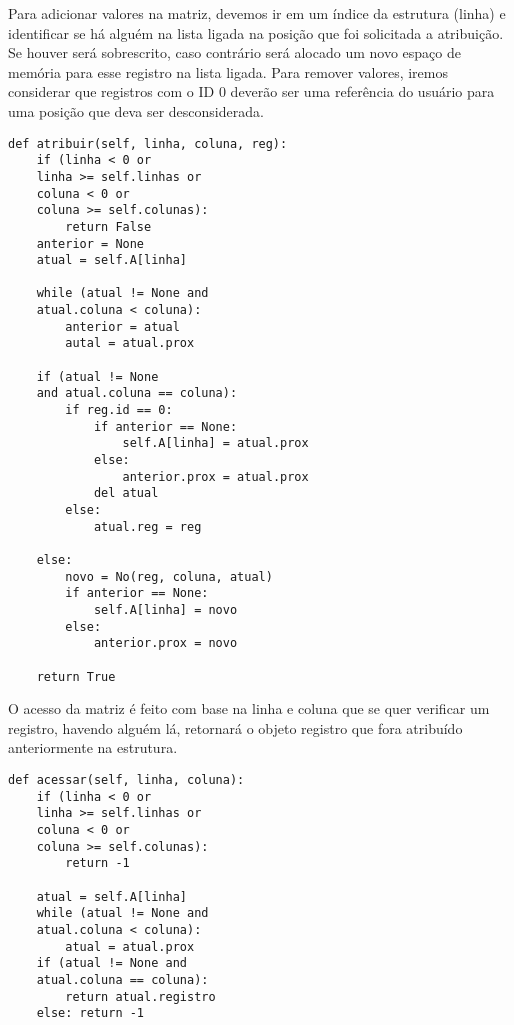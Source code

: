 \documentclass[a4paper, twocolumn]{article}
\theoremstyle{definition}
\begin{document}
Para adicionar valores na matriz, devemos ir em um índice da estrutura (linha) e identificar se há alguém na lista ligada na posição que foi solicitada a atribuição. Se houver será sobrescrito, caso contrário será alocado um novo espaço de memória para esse registro na lista ligada. Para remover valores, iremos considerar que registros com o ID 0 deverão ser uma referência do usuário para uma posição que deva ser desconsiderada.
\begin{lstlisting}[label=matriz_atribuir, caption= Matriz Esparsa (atribuição)]
def atribuir(self, linha, coluna, reg):
    if (linha < 0 or
    linha >= self.linhas or
    coluna < 0 or
    coluna >= self.colunas):
        return False
    anterior = None
    atual = self.A[linha]
    
    while (atual != None and
    atual.coluna < coluna):
        anterior = atual
        autal = atual.prox

    if (atual != None 
    and atual.coluna == coluna):
        if reg.id == 0:
            if anterior == None:
                self.A[linha] = atual.prox
            else:
                anterior.prox = atual.prox
            del atual
        else:
            atual.reg = reg
    
    else:
        novo = No(reg, coluna, atual)
        if anterior == None:
            self.A[linha] = novo
        else:
            anterior.prox = novo

    return True
\end{lstlisting}

O acesso da matriz é feito com base na linha e coluna que se quer verificar um registro, havendo alguém lá, retornará o objeto registro que fora atribuído anteriormente na estrutura.
\begin{lstlisting}[label=matriz_acesso, caption= Matriz Esparsa (acesso)]
def acessar(self, linha, coluna):
    if (linha < 0 or 
    linha >= self.linhas or
    coluna < 0 or
    coluna >= self.colunas):
        return -1

    atual = self.A[linha]
    while (atual != None and
    atual.coluna < coluna):
        atual = atual.prox
    if (atual != None and
    atual.coluna == coluna):
        return atual.registro
    else: return -1
\end{lstlisting}
\end{document}
